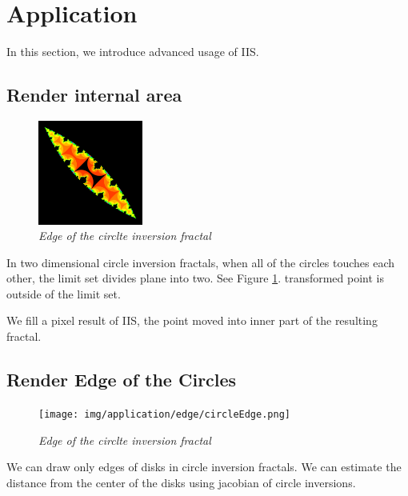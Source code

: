 
\section{Application}

In this section, we introduce advanced usage of IIS.

\subsection{Render internal area}

\begin{figure}[htbp]
  \center
  \includegraphics[height=1.35in, keepaspectratio]{img/application/internal/schottky.png}
  \caption{\textit{Edge of the circlte inversion fractal}}
  \label{fig:divideTwo}
 \hspace*{\fill}
\end{figure}


In two dimensional circle inversion fractals,
when all of the circles touches each other, the limit set divides plane
into two. See Figure \ref{fig:divideTwo}.
transformed point is outside of the limit set.

We fill a pixel result of IIS, the point moved into inner part of the
resulting fractal.

\subsection{Render Edge of the Circles}

\begin{figure}[htbp]
  \center
  \texttt{[image: img/application/edge/circleEdge.png]}
  \caption{\textit{Edge of the circlte inversion fractal}}
  \label{fig:circleEdge}
 \hspace*{\fill}
\end{figure}

We can draw only edges of disks in circle inversion fractals.
We can estimate the distance from the center of the disks using jacobian
of circle inversions.

